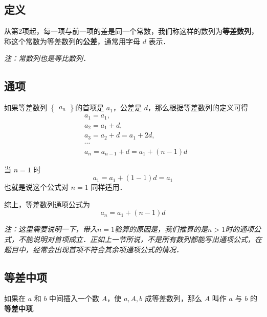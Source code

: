 
\begin{issues}
\issueDraft
\end{issues}

\subsection{定义}
从第2项起，每一项与前一项的差是同一个常数，我们称这样的数列为\textbf{等差数列}，称这个常数为等差数列的\textbf{公差}，通常用字母 $d$ 表示．

\textsl{注：常数列也是等比数列．}

\subsection{通项}
如果等差数列 $\begin{Bmatrix} a_n \end{Bmatrix}$的首项是 $a_1$，公差是 $d$，那么根据等差数列的定义可得
\begin{equation}
\begin{aligned}
&a_1 = a_1,\\
&a_2 = a_1 + d,\\
&a_3 = a_2 + d = a_1 + 2d,\\
&\cdots \\
&a_n = a_{n-1} + d = a_1 + (n - 1)d
\end{aligned}
\end{equation}

当 $n = 1$ 时
\begin{equation}
a_1 = a_1 + (1 - 1)d = a_1
\end{equation}
也就是说这个公式对 $n = 1$ 同样适用．

综上，等差数列通项公式为
\begin{equation}
a_n = a_1 + (n - 1)d
\end{equation}

\textsl{注：这里需要说明一下，带入$n = 1$验算的原因是，我们推算的是$n > 1$时的通项公式，不能说明对首项成立．正如上一节所说，不是所有数列都能写出通项公式，在题目中，经常会出现首项不符合其余项通项公式的情况．}

\subsection{等差中项}
如果在 $a$ 和 $b$ 中间插入一个数 $A$，使 $a,A,b$ 成等差数列，那么 $A$ 叫作 $a$ 与 $b$ 的\textbf{等差中项}.

